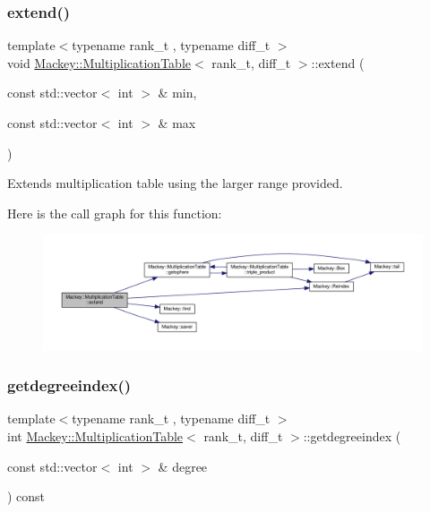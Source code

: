 \subsubsection{\texorpdfstring{extend()}{extend()}}
{\footnotesize\ttfamily template$<$typename rank\+\_\+t , typename diff\+\_\+t $>$ \\
void \hyperlink{classMackey_1_1MultiplicationTable}{Mackey\+::\+Multiplication\+Table}$<$ rank\+\_\+t, diff\+\_\+t $>$\+::extend (\begin{DoxyParamCaption}\item[{const std\+::vector$<$ int $>$ \&}]{min,  }\item[{const std\+::vector$<$ int $>$ \&}]{max }\end{DoxyParamCaption})}



Extends multiplication table using the larger range provided. 

Here is the call graph for this function\+:\nopagebreak
\begin{figure}[H]
\begin{center}
\leavevmode
\includegraphics[width=350pt]{classMackey_1_1MultiplicationTable_a4371e6ba8a058073c005e636979b7230_cgraph}
\end{center}
\end{figure}
\mbox{\label{classMackey_1_1MultiplicationTable_ac15f13c4a9d160226582e1970ef4b00c}} 
\subsubsection{\texorpdfstring{getdegreeindex()}{getdegreeindex()}}
{\footnotesize\ttfamily template$<$typename rank\+\_\+t , typename diff\+\_\+t $>$ \\
int \hyperlink{classMackey_1_1MultiplicationTable}{Mackey\+::\+Multiplication\+Table}$<$ rank\+\_\+t, diff\+\_\+t $>$\+::getdegreeindex (\begin{DoxyParamCaption}\item[{const std\+::vector$<$ int $>$ \&}]{degree }\end{DoxyParamCaption}) const\hspace{0.3cm}{\ttfamily [inline]}}



